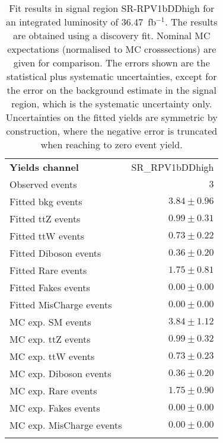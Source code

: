 

\begin{table}
\begin{center}
\setlength{\tabcolsep}{0.0pc}
{\small
\begin{tabular*}{\textwidth}{@{\extracolsep{\fill}}lr}
\noalign{\smallskip}\hline\noalign{\smallskip}
{\bfseries Yields channel}           & SR\_RPV1bDDhigh              \\[-0.05cm]
\noalign{\smallskip}\hline\noalign{\smallskip}
Observed events          & $3$                    \\
\noalign{\smallskip}\hline\noalign{\smallskip}
Fitted bkg events         & $3.84 \pm 0.96$              \\
\noalign{\smallskip}\hline\noalign{\smallskip}
        Fitted ttZ events         & $0.99 \pm 0.31$              \\
        Fitted ttW events         & $0.73 \pm 0.22$              \\
        Fitted Diboson events         & $0.36 \pm 0.20$              \\
        Fitted Rare events         & $1.75 \pm 0.81$              \\
        Fitted Fakes events         & $0.00 \pm 0.00$              \\
        Fitted MisCharge events         & $0.00 \pm 0.00$              \\
 \noalign{\smallskip}\hline\noalign{\smallskip}
MC exp. SM events              & $3.84 \pm 1.12$              \\
\noalign{\smallskip}\hline\noalign{\smallskip}
        MC exp. ttZ events         & $0.99 \pm 0.32$              \\
        MC exp. ttW events         & $0.73 \pm 0.23$              \\
        MC exp. Diboson events         & $0.36 \pm 0.20$              \\
        MC exp. Rare events         & $1.75 \pm 0.90$              \\
        MC exp. Fakes events         & $0.00 \pm 0.00$              \\
        MC exp. MisCharge events         & $0.00 \pm 0.00$              \\
\noalign{\smallskip}\hline\noalign{\smallskip}
\end{tabular*}
}
\end{center}
\caption{Fit results in signal region SR-RPV1bDDhigh for an integrated luminosity of 36.47~fb$^{-1}$.
The results are obtained using a discovery fit. Nominal MC expectations (normalised to MC crosssections) are given for comparison. 
The errors shown are the statistical plus systematic uncertainties, except for the error on the background estimate in the signal region, which is the systematic uncertainty only.
Uncertainties on the fitted yields are symmetric by construction, where the negative error is truncated when reaching to zero event yield.
}
\label{table.results.systematics.in.logL.fit..Yields.SR-RPV1bDDhigh}
\end{table}
\clearpage
%